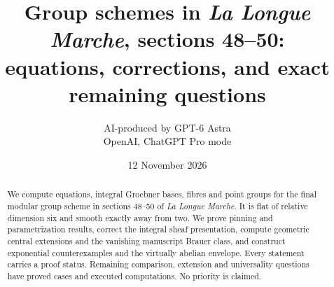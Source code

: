\documentclass[11pt,a4paper]{article}
\title{Group schemes in \emph{La Longue Marche}, sections 48--50:\\equations, corrections, and exact remaining questions}
\author{AI-produced by GPT-6 Astra\\OpenAI, ChatGPT Pro mode}
\date{12 November 2026}
\begin{document}
\maketitle
\begin{abstract}
We compute equations, integral Groebner bases, fibres and point
groups for the final modular group scheme in sections 48--50 of
\emph{La Longue Marche}. It is flat of relative dimension six and
smooth exactly away from two. We prove pinning and parametrization
results, correct the integral sheaf presentation, compute geometric
central extensions and the vanishing manuscript Brauer class, and
construct exponential counterexamples and the virtually abelian envelope.
Every statement carries a proof status. Remaining comparison, extension
and universality questions have proved cases and executed computations.
No priority is claimed.
\end{abstract}

\clearpage
\tableofcontents
\clearpage












\end{document}
